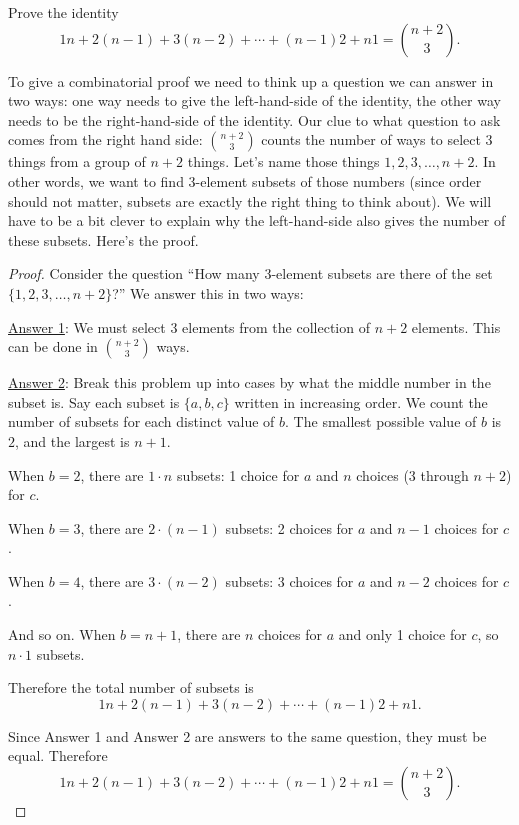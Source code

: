 \documentclass[12pt]{article}
\begin{document}
\begin{example}
  Prove the identity
  \[1 n + 2(n-1) + 3  (n-2) + \cdots + (n-1) 2 + n  1 = {n+2 \choose 3}.\]
  \begin{solution}
    To give a combinatorial proof we need to think up a question we can answer in two ways: one way needs to give the left-hand-side of the identity, the other way needs to be the right-hand-side of the identity.  Our clue to what question to ask comes from the right hand side: ${n+2 \choose 3}$ counts the number of ways to select 3 things from a group of $n+2$ things.  Let's name those things $1, 2, 3, \ldots, n+2$.  In other words, we want to find 3-element subsets of those numbers (since order should not matter, subsets are exactly the right thing to think about).  We will have to be a bit clever to explain why the left-hand-side also gives the number of these subsets.  Here's the proof.
    
    \begin{proof}
      Consider the question ``How many 3-element subsets are there of the set $\{1,2,3,\ldots, n+2\}$?''  We answer this in two ways:
      
      \underline{Answer 1}: We must select 3 elements from the collection of $n+2$ elements.  This can be done in ${n+2 \choose 3}$ ways.
      
      \underline{Answer 2}: Break this problem up into cases by what the middle number in the subset is.  Say each subset is $\{a,b,c\}$ written in increasing order.  We count the number of subsets for each distinct value of $b$.  The smallest possible value of $b$ is $2$, and the largest is $n+1$.  
      
      When $b = 2$, there are $1 \cdot n$ subsets: 1 choice for $a$ and $n$ choices (3 through $n+2$) for $c$.
      
      When $b = 3$, there are $2 \cdot (n-1)$ subsets: 2 choices for $a$ and $n-1$ choices for $c$.
      
      When $b = 4$, there are $3 \cdot (n-2)$ subsets: 3 choices for $a$ and $n-2$ choices for $c$.
      
      And so on.  When $b = n+1$, there are $n$ choices for $a$ and only 1 choice for $c$, so $n \cdot 1$ subsets.
      
      Therefore the total number of subsets is \[1 n + 2 (n-1) + 3  (n-2) + \cdots + (n-1)2 + n  1.\]
      
      Since Answer 1 and Answer 2 are answers to the same question, they must be equal.  Therefore
      \[1 n + 2 (n-1) + 3  (n-2) + \cdots + (n-1) 2 + n  1 = {n+2 \choose 3}.\]
      
    \end{proof}

  \end{solution}

\end{example}
\end{document}
